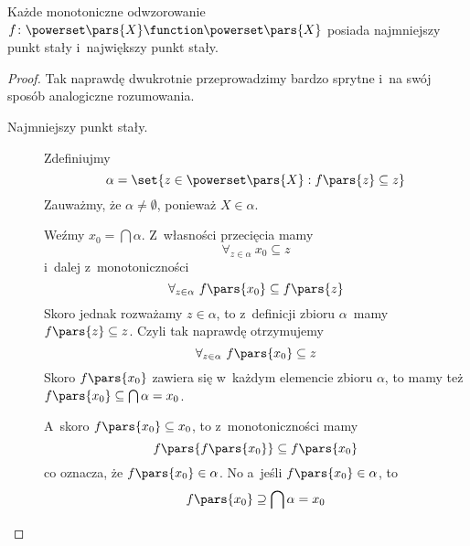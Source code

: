 \begin{theorem}
Każde monotoniczne odwzorowanie \(f\colon \powerset\pars{X} \function \powerset\pars{X}\) posiada najmniejszy punkt stały i~największy punkt stały.
\end{theorem}
\begin{proof}
    Tak naprawdę dwukrotnie przeprowadzimy bardzo sprytne i~na swój sposób analogiczne rozumowania.
    \begin{description}
        \item[Najmniejszy punkt stały.] Zdefiniujmy
            \begin{equation*}
                \alpha = \set{z \in \powerset\pars{X} : f\pars{z} \subseteq z}
            \end{equation*}
            Zauważmy, że \(\alpha \neq \emptyset\), ponieważ \(X \in \alpha\).
            
            Weźmy \(x_0 = \bigcap \alpha\). Z~własności przecięcia mamy
            \begin{equation*}
                \forall_{z \in \alpha} \ x_0 \subseteq z
            \end{equation*}
            i~dalej z~monotoniczności
            \begin{equation*}
                \forall_{z \in \alpha} \ f\pars{x_0} \subseteq f\pars{z}
            \end{equation*}
            Skoro jednak rozważamy \(z \in \alpha\), to z~definicji zbioru \(\alpha\)~mamy \(f\pars{z} \subseteq z\). Czyli tak naprawdę otrzymujemy
            \begin{equation*}
                \forall_{z \in \alpha} \ f\pars{x_0} \subseteq z
            \end{equation*}
            Skoro \(f\pars{x_0}\) zawiera się w~każdym elemencie zbioru \(\alpha\), to mamy też \(f\pars{x_0} \subseteq \bigcap \alpha = x_0\).
            
            A~skoro \(f\pars{x_0} \subseteq x_0\), to z~monotoniczności mamy
            \begin{equation*}
                f\pars{f\pars{x_0}} \subseteq f\pars{x_0}
            \end{equation*}
            co oznacza, że \(f\pars{x_0} \in \alpha\). No a~jeśli \(f\pars{x_0} \in \alpha\), to
            \begin{equation*}
                f\pars{x_0} \supseteq \bigcap \alpha = x_0
            \end{equation*}
            

\end{description}
\end{proof}
